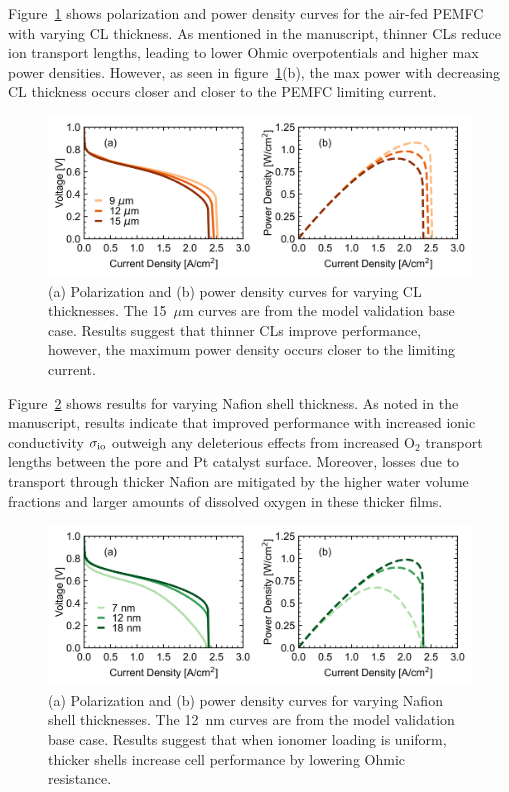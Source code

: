 \documentclass[final,3p,times,onecolumn]{elsarticle}    %
\begin{document}
Figure~\ref{fig:CL-thickness-study} shows polarization and power density curves for the air-fed PEMFC with varying CL thickness. As mentioned in the manuscript, thinner CLs reduce ion transport lengths, leading to lower Ohmic overpotentials and higher max power densities.  However, as seen in figure~\ref{fig:CL-thickness-study}(b), the max power with decreasing CL thickness occurs closer and closer to the PEMFC limiting current.
\begin{figure}[H]
    \centering
    \includegraphics[width=5.718in]{figures/CL-thickness-5_718in.png}
    \caption{(a) Polarization and (b) power density curves for varying CL thicknesses. The 15~$\mu$m curves are from the model validation base case. Results suggest that thinner CLs improve performance, however, the maximum power density occurs closer to the limiting current.}
    \label{fig:CL-thickness-study}
\end{figure}

Figure~\ref{fig:naf-thickness-study} shows results for varying Nafion shell thickness. As noted in the manuscript, results indicate that improved performance with increased ionic conductivity $\sigma_{\rm io}$ outweigh any deleterious effects from increased O$_2$ transport lengths between the pore and Pt catalyst surface. Moreover, losses due to transport through thicker Nafion are mitigated by the higher water volume fractions and larger amounts of dissolved oxygen in these thicker films.
\begin{figure}[H]
    \centering
    \includegraphics[width=5.718in]{figures/naf-thickness-5_718in.png}
    \caption{(a) Polarization and (b) power density curves for varying Nafion shell thicknesses. The 12~nm curves are from the model validation base case. Results suggest that when ionomer loading is uniform, thicker shells increase cell performance by lowering Ohmic resistance.}
    \label{fig:naf-thickness-study}
\end{figure}
\end{document}
